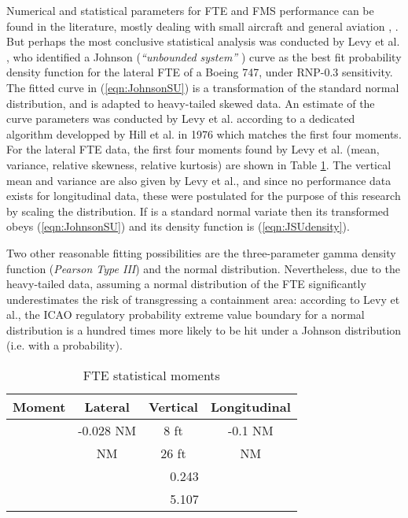 \documentclass[conference]{IEEEtran}
\begin{document}
Numerical and statistical parameters for FTE and FMS performance can be found in the literature, mostly dealing with small aircraft and general aviation \cite{Hun93}, \cite{Wil05}. But perhaps the most conclusive statistical analysis was conducted by Levy et al. \cite{Lev03}, who identified a Johnson  (\emph{``unbounded system''} \cite{Jon49}) curve as the best fit probability density function for the lateral FTE of a Boeing 747, under RNP-0.3 sensitivity. The fitted curve in (\ref{eqn:JohnsonSU}) is a transformation of the standard normal distribution, and is adapted to heavy-tailed skewed data. An estimate of the curve parameters was conducted by Levy et al. according to a dedicated algorithm developped by Hill et al. in 1976 \cite{Hil76} which matches the first four moments. For the lateral FTE data, the first four moments found by Levy et al. (mean, variance, relative skewness, relative kurtosis) are shown in Table \ref{tab:FTEfit}. The vertical mean and variance are also given by Levy et al., and since no performance data exists for longitudinal data, these were postulated for the purpose of this research by scaling the distribution. If  is a standard normal variate then its transformed  obeys (\ref{eqn:JohnsonSU}) and its density function is (\ref{eqn:JSUdensity}).




Two other reasonable fitting possibilities are the three-parameter gamma density function (\emph{Pearson Type III}) and the normal distribution. Nevertheless, due to the heavy-tailed data, assuming a normal distribution of the FTE significantly underestimates the risk of transgressing a containment area: according to Levy et al., the ICAO regulatory  probability extreme value boundary for a normal distribution is a hundred times more likely to be hit under a Johnson  distribution (i.e. with a  probability).

\begin{table}
\caption{FTE statistical  moments}
\label{tab:FTEfit}
\centering
\begin{tabular}{|l|c|c|c|}
\hline\hline
Moment & Lateral & Vertical & Longitudinal \bigstrut\\ \hline\hline
& -0.028 NM & 8 ft & -0.1 NM  \bigstrut \\ \hline
 &  NM & 26 ft &  NM \bigstrut \\ \hline
 & \multicolumn{3}{c|}{0.243} \bigstrut \\ \hline
 & \multicolumn{3}{c|}{5.107} \bigstrut\\ \hline\hline
\end{tabular}
\end{table}
\end{document}

